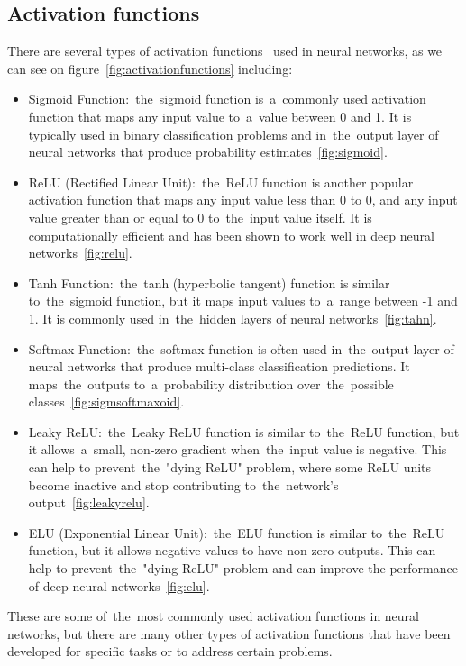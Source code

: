 \subsection{Activation functions} \label{subsec:nnaf}
There are several types of activation functions~\cite{geron2022hands} used in neural networks, as we can see on figure~\ref{fig:activationfunctions} including:
\begin{itemize}
    \item Sigmoid Function:~the~sigmoid function is~a~commonly used activation function that maps any input value
    to~a~value between 0 and 1. It is typically used in binary classification problems and in~the~output layer of
    neural networks that produce probability estimates~\ref{fig:sigmoid}.
    \item ReLU (Rectified Linear Unit):~the~ReLU function is another popular activation function that maps any
    input value less than 0 to 0, and any input value greater than or equal to 0 to~the~input value itself.
    It is computationally efficient and has been shown to work well in deep neural networks~\ref{fig:relu}.
    \item Tanh Function:~the~tanh (hyperbolic tangent) function is similar to~the~sigmoid function,
    but it maps input values to~a~range between -1 and 1. It is commonly used in~the~hidden layers of neural networks~\ref{fig:tahn}.
    \item Softmax Function:~the~softmax function is often used in~the~output layer of neural networks that produce
    multi-class classification predictions. It maps~the~outputs to~a~probability distribution over~the~possible classes~\ref{fig:sigmsoftmaxoid}.
    \item Leaky ReLU:~the~Leaky ReLU function is similar to~the~ReLU function, but it allows~a~small, non-zero
    gradient when~the~input value is negative. This can help to prevent~the~"dying ReLU" problem, where some ReLU
    units become inactive and stop contributing to~the~network's output~\ref{fig:leakyrelu}.
    \item ELU (Exponential Linear Unit):~the~ELU function is similar to~the~ReLU function, but it allows negative
    values to have non-zero outputs. This can help to prevent~the~"dying ReLU" problem and can improve the
    performance of deep neural networks~\ref{fig:elu}.
\end{itemize}
These are some of~the~most commonly used activation functions in neural networks, but there are many other types of
activation functions that have been developed for specific tasks or to address certain problems.

